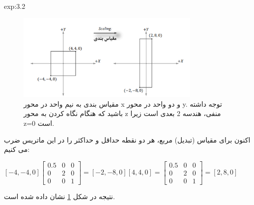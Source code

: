 {\begin{spacing}{1.5}
\begin{example}{exp:3.2}
            \begin{figure}[H]
                \centering
                \setlength{\belowcaptionskip}{-10pt}
                \includegraphics[width=0.8\textwidth]{Images/4/3/4.Session.1.3.2}
                \caption {مقیاس بندی به نیم واحد در محور x و دو واحد در محور y. توجه داشته باشید که هنگام نگاه کردن به محور z منفی، هندسه 2 بعدی است زیرا z=0 است.}
                \label{fig:4.Session.1.3.2}
            \end{figure}

            اکنون برای مقیاس (تبدیل) مربع، هر دو نقطه حداقل و حداکثر را در این ماتریس ضرب می کنیم:

            \begin{center}
                $[-4,-4,0]\begin{bmatrix}
                              0.5 & 0 & 0 \\
                              0   & 2 & 0 \\
                              0   & 0 & 1
                \end{bmatrix}=[-2,-8,0]$\hspace{5 mm}$[4,4,0]=\begin{bmatrix}
                                                                  0.5 & 0 & 0 \\
                                                                  0   & 2 & 0 \\
                                                                  0   & 0 & 1
                \end{bmatrix}=[2,8,0]$
            \end{center}

            نتیجه در شکل \ref{fig:4.Session.1.3.2} نشان داده شده است.
        \end{example}
    \end{spacing}
}

